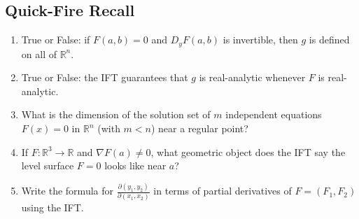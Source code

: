\subsection{Quick-Fire Recall}

\begin{enumerate}[resume]
  \item True or False: if $F(a,b) = 0$ and $D_y F(a,b)$ is invertible, then $g$ is defined on all of $\mathbb{R}^n$.
  \item True or False: the IFT guarantees that $g$ is real-analytic whenever $F$ is real-analytic.
  \item What is the dimension of the solution set of $m$ independent equations $F(x) = 0$ in $\mathbb{R}^n$ (with $m < n$) near a regular point?
  \item If $F : \mathbb{R}^3 \to \mathbb{R}$ and $\nabla F(a) \neq 0$, what geometric object does the IFT say the level surface $F = 0$ looks like near $a$?
  \item Write the formula for $\frac{\partial(y_1, y_2)}{\partial(x_1, x_2)}$ in terms of partial derivatives of $F = (F_1, F_2)$ using the IFT.
\end{enumerate}
